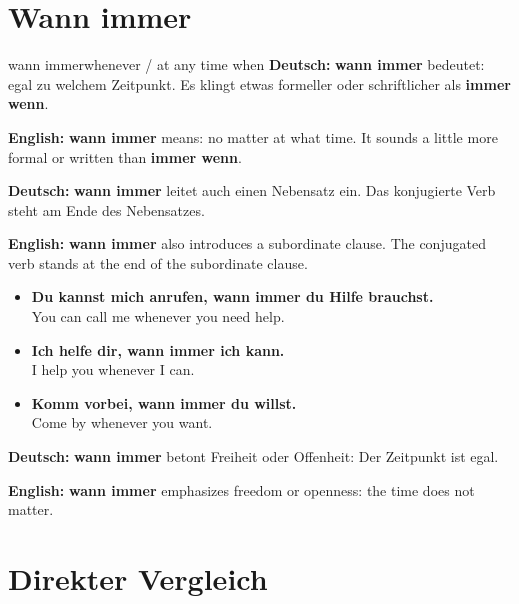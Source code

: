 \documentclass[a4paper,11pt]{article}
\newcommand{\GermanText}[1]{\textbf{Deutsch: }#1\par}
\newcommand{\EnglishText}[1]{{\small\color{SoftGray}\textbf{English: }#1\par}}
\newcommand{\ExampleItem}[2]{\item \textbf{#1}\\{\small\color{SoftGray}#2}}
\begin{document}
\section{Wann immer}

\begin{grammarentry}{wann immer}{whenever / at any time when}
\GermanText{\textbf{wann immer} bedeutet: egal zu welchem Zeitpunkt. Es klingt etwas formeller oder schriftlicher als \textbf{immer wenn}.}
\EnglishText{\textbf{wann immer} means: no matter at what time. It sounds a little more formal or written than \textbf{immer wenn}.}

\GermanText{\textbf{wann immer} leitet auch einen Nebensatz ein. Das konjugierte Verb steht am Ende des Nebensatzes.}
\EnglishText{\textbf{wann immer} also introduces a subordinate clause. The conjugated verb stands at the end of the subordinate clause.}

\begin{exbox}
\begin{itemize}
    \ExampleItem{Du kannst mich anrufen, wann immer du Hilfe brauchst.}{You can call me whenever you need help.}
    \ExampleItem{Ich helfe dir, wann immer ich kann.}{I help you whenever I can.}
    \ExampleItem{Komm vorbei, wann immer du willst.}{Come by whenever you want.}
\end{itemize}
\end{exbox}

\GermanText{\textbf{wann immer} betont Freiheit oder Offenheit: Der Zeitpunkt ist egal.}
\EnglishText{\textbf{wann immer} emphasizes freedom or openness: the time does not matter.}
\end{grammarentry}

\section{Direkter Vergleich}
\end{document}
